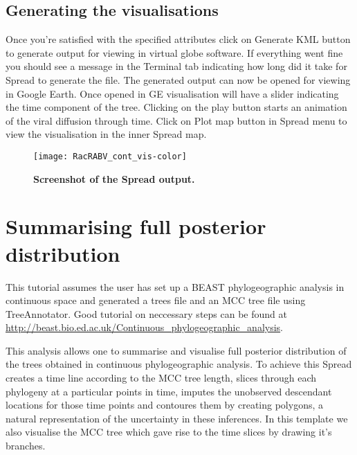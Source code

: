 \subsection{Generating the visualisations}

Once you're satisfied with the specified attributes click on Generate
KML button to generate output for viewing in virtual globe software.
If everything went fine you should see a message in the Terminal tab
indicating how long did it take for Spread to generate the file. The
generated output can now be opened for viewing in Google Earth. Once
opened in GE visualisation will have a slider indicating the time
component of the tree. Clicking on the play button starts an animation
of the viral diffusion through time. Click on Plot map button in Spread
menu to view the visualisation in the inner Spread map.

\begin{figure}[H]
\begin{centering}
\texttt{[image: RacRABV\_cont\_vis-color]}
\caption{
{ \footnotesize 
{\bf Screenshot of the Spread output.}
} %
}
\label{fig:RacRABV_cont_vis}
\par\end{centering}
\end{figure}

\section{Summarising full posterior distribution}

This tutorial assumes the user has set up a BEAST phylogeographic
analysis in continuous space and generated a trees file and an MCC
tree file using TreeAnnotator. Good tutorial on neccessary steps can
be found at \url{http://beast.bio.ed.ac.uk/Continuous_phylogeographic_analysis}.

This analysis allows one to summarise and visualise full posterior
distribution of the trees obtained in continuous phylogeographic analysis.
To achieve this Spread creates a time line according to the MCC tree
length, slices through each phylogeny at a particular points in time,
imputes the unobserved descendant locations for those time points
and contoures them by creating polygons, a natural representation
of the uncertainty in these inferences. In this template we also visualise
the MCC tree which gave rise to the time slices by drawing it's branches.

